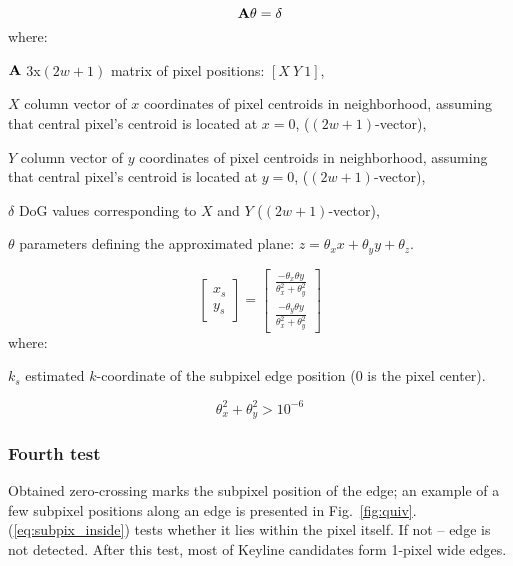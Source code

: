 \begin{equation}
\textbf{A}\theta = \delta
\label{eq:regress}
\end{equation}
where:
\begin{eqwhere}[2cm]
	\item[$\textbf{A}$] 3x$(2w+1)$ matrix of pixel positions: $[X\ Y\ 1]$,
	\item[$X$] column vector of $x$ coordinates of pixel centroids in neighborhood, assuming that central pixel's centroid is located at $x = 0$, ($(2w+1)$-vector),
	\item[$Y$] column vector of $y$ coordinates of pixel centroids in neighborhood, assuming that central pixel's centroid is located at $y = 0$, ($(2w+1)$-vector),
	\item[$\delta$] DoG values corresponding to $X$ and $Y$ ($(2w+1)$-vector),
	\item[$\theta$] parameters defining the approximated plane: $z = \theta_{x}x + \theta_{y}y + \theta_{z}$.
\end{eqwhere}



\begin{equation}
\begin{bmatrix}
x_s \\
y_s 
\end{bmatrix} = 
\begin{bmatrix}
\frac{-\theta_{x} \theta{y}}{\theta_x^2 + \theta_y^2} \\
\frac{-\theta_{y} \theta{y}}{\theta_x^2 + \theta_y^2}
\end{bmatrix}
\label{eq:zerocross}
\end{equation}
where:
\begin{eqwhere}[2cm]
	\item[$k_s$] estimated $k$-coordinate of the subpixel edge position (0 is the pixel center).
\end{eqwhere}

\begin{equation}
\theta_{x}^2 + \theta_{y}^2 > 10^{-6}
\label{eq:test3}
\end{equation}

\subsubsection*{Fourth test}
\label{edge_fourth}

Obtained zero-crossing marks the subpixel position of the edge; an example of a few subpixel positions along an edge is presented in Fig.~\ref{fig:quiv}. (\ref{eq:subpix_inside}) tests whether it lies within the pixel itself. If not -- edge is not detected. After this test, most of Keyline candidates form 1-pixel wide edges.

